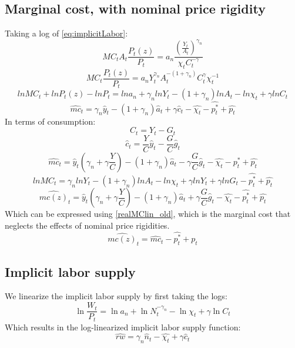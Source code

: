 \documentclass[10pt,a4paper]{article}
\begin{document}
\subsection{Marginal cost, with nominal price rigidity}
Taking a log of \eqref{eq:implicitLabor}:
$$MC_{t}A_{t}\frac{P_t(z)}{P_t}=a_{n}\frac{\left(\frac{Y_{t}}{A_{t}}\right)^{\gamma_{n}}}{\chi_{t} C_{t}^{-\gamma}}$$
$$MC_{t}\frac{P_t(z)}{P_t}=a_{n}Y_{t}^{\gamma_{n}}A_{t}^{-\left(1+\gamma_{n}\right)}C_{t}^{\gamma}\chi_{t}^{-1}$$
$$ln{MC}_{t}+lnP_t(z)-lnP_t=ln a_{n} + \gamma_{n}ln {Y}_{t}-\left(1+\gamma_{n}\right)ln {A}_{t}- ln \chi_{t} + \gamma ln C_{t}$$
$$\hat{mc}_{t}=\gamma_{n}\hat{y}_{t}-\left(1+\gamma_{n}\right)\hat{a}_{t}+\gamma\hat{c}_{t}-\hat{\chi_{t}}-\hat{p_t^*}+\hat{p_t}$$
In terms of consumption:
$$C_{t}=Y_{t}-G_{t}$$
$$\hat{c}_{t}=\frac{Y}{C}\hat{y}_{t}-\frac{G}{C}\hat{g}_{t}$$
$$ \hat{mc}_{t}=\hat{y}_{t}\left(\gamma_{n}+\gamma\frac{Y}{C}\right)-\left(1+\gamma_{n}\right)\hat{a}_{t}-\gamma\frac{G}{C}\hat{g}_{t}-\hat{\chi_{t}}-\hat{p_t^*}+\hat{p_t}$$
$$ln{MC}_{t}=\gamma_{n}ln {Y}_{t}-\left(1+\gamma_{n}\right)ln {A}_{t}- ln \chi_{t} + \gamma ln Y_{t} +  \gamma ln G_{t}-\hat{p_t^*}+\hat{p_t}$$
\begin{equation}\label{realMClin_new} 
\hat{mc(z)}_{t}=\hat{y}_{t}\left(\gamma_{n}+\gamma\frac{Y}{C}\right)-\left(1+\gamma_{n}\right)\hat{a}_{t}+\gamma\frac{G}{C}\hat{g}_{t}-\hat{\chi_{t}}-\hat{p_t^*}+\hat{p_t}
\end{equation}
Which can be expressed using \eqref{realMClin_old}, which is the marginal cost that neglects the effects of nominal price rigidities.
\begin{equation}\label{eq:MC_z}
\hat{mc(z)}_{t} = \hat{mc}_{t} -\hat{p_t^*} + \hat{p_t}
\end{equation}
\subsection{Implicit labor supply}
We linearize the implicit labor supply by first taking the logs:
 $$\ln\frac{W_{t}}{P_{t}}=\ln a_{n}+\ln N_{t}^{-\gamma_{n}}-\ln\chi_{t}+\gamma\ln C_{t}$$
 Which results in the log-linearized implicit labor supply function:
 $$\hat{rw}=\gamma_{n}\hat{n}_{t}-\hat{\chi_{t}}+\gamma\hat{c}_{t}$$
\end{document}
